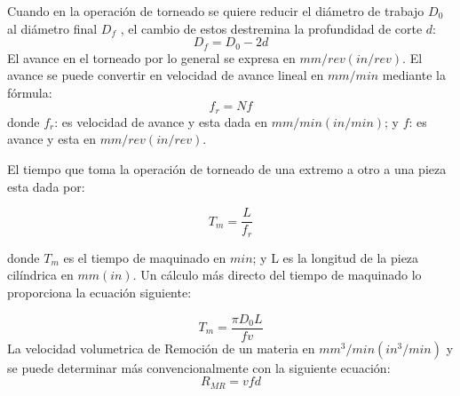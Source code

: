 Cuando en la operación de torneado se quiere reducir el diámetro de trabajo $D_{0}$ al diámetro final $D_{f}$ , el cambio de estos destremina la profundidad de corte $d$: 
\begin{equation}
    D_{f}=D_{0}-2d
\end{equation}
El avance en el torneado por lo general se expresa en $mm/rev (in/rev )$. El avance se puede convertir en velocidad de avance lineal en $mm/min$ mediante la fórmula:
\begin{equation}
    f_{r}=Nf
\end{equation}
 donde $f_{r}$: es velocidad de avance y esta dada en $mm/min (in/min)$; y $f$: es avance y esta en $mm/rev (in/rev).$
 
 El tiempo que toma la operación de torneado de una extremo a otro  a una pieza esta dada por:
 
 \begin{equation}
     T_{m}=\frac{L}{f_{r}}
 \end{equation}
 
 donde $T_{m}$ es el tiempo de maquinado en $min$; y L es la longitud de la pieza cilíndrica en $mm (in)$.
Un cálculo más directo del tiempo de maquinado lo proporciona la ecuación siguiente:
 
 \begin{equation}
     T_{m}=\frac{\pi D_{0} L}{f v}
 \end{equation}
La velocidad volumetrica de Remoción de un materia en $mm^{3}/min(in^{3}/min)$ y se puede determinar más convencionalmente con la siguiente ecuación:
\begin{equation}
    R_{MR}=vfd
\end{equation}


